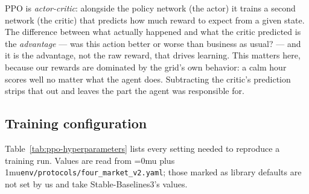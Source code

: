 ﻿\documentclass[12pt]{article}
\newcommand{\codepath}[1]{{\Urlmuskip=0mu plus 1mu\relax\nolinkurl{#1}}}
\begin{document}
PPO is \emph{actor-critic}: alongside the policy network (the actor) it trains a
second network (the critic) that predicts how much reward to expect from a given
state. The difference between what actually happened and what the critic
predicted is the \emph{advantage} --- was this action better or worse than
business as usual? --- and it is the advantage, not the raw reward, that drives
learning. This matters here, because our rewards are dominated by the grid's own
behavior: a calm hour scores well no matter what the agent does. Subtracting the
critic's prediction strips that out and leaves the part the agent was
responsible for.

\subsection{Training configuration}
\label{subsec:objective-training-config}

Table~\ref{tab:ppo-hyperparameters} lists every setting needed to reproduce a
training run. Values are read from \codepath{env/protocols/four_market_v2.yaml};
those marked as library defaults are not set by us and take Stable-Baselines3's
values.
\end{document}
